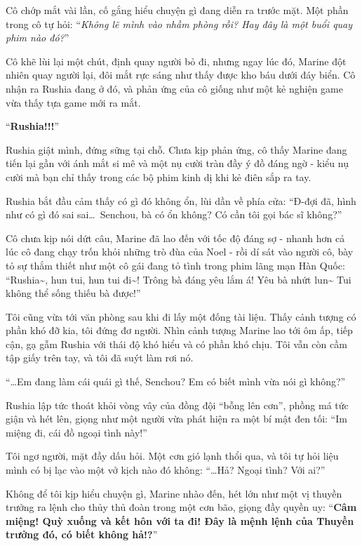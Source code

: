 \documentclass[../main.tex]{subfiles}
\begin{document}
Cô chớp mắt vài lần, cố gắng hiểu chuyện gì đang diễn ra trước mặt. Một phần trong cô tự hỏi: ``\textit{Không lẽ mình vào nhầm phòng rồi? Hay đây là một buổi quay phim nào đó?}''

Cô khẽ lùi lại một chút, định quay người bỏ đi, nhưng ngay lúc đó, Marine đột nhiên quay người lại, đôi mắt rực sáng như thấy được kho báu dưới đáy biển. Cô nhận ra Rushia đang ở đó, và phản ứng của cô giống như một kẻ nghiện game vừa thấy tựa game mới ra mắt.

``\textbf{Rushia!!!}''

Rushia giật mình, đứng sững tại chỗ. Chưa kịp phản ứng, cô thấy Marine đang tiến lại gần với ánh mắt si mê và một nụ cười tràn đầy ý đồ đáng ngờ - kiểu nụ cười mà bạn chỉ thấy trong các bộ phim kinh dị khi kẻ điên sắp ra tay.

Rushia bắt đầu cảm thấy có gì đó không ổn, lùi dần về phía cửa: ``Đ-đợi đã, hình như có gì đó sai sai\dots\ Senchou, bà có ổn không? Có cần tôi gọi bác sĩ không?''

Cô chưa kịp nói dứt câu, Marine đã lao đến với tốc độ đáng sợ - nhanh hơn cả lúc cô đang chạy trốn khỏi những trò đùa của Noel - rồi dí sát vào người cô, bày tỏ sự thắm thiết như một cô gái đang tỏ tình trong phim lãng mạn Hàn Quốc: ``Rushia\~{}, hun tui, hun tui đi\~{}! Trông bà đáng yêu lắm á! Yêu bà nhứt lun\~{} Tui không thể sống thiếu bà được!''


Tôi cũng vừa tới văn phòng sau khi đi lấy một đống tài liệu. Thấy cảnh tượng có phần khó đỡ kia, tôi đứng đơ người. Nhìn cảnh tượng Marine lao tới ôm ấp, tiếp cận, gạ gẫm Rushia với thái độ khó hiểu và có phần khó chịu. Tôi vẫn còn cầm tập giấy trên tay, và tôi đã suýt làm rơi nó.

``\dots  Em đang làm cái quái gì thế, Senchou? Em có biết mình vừa nói gì không?''

Rushia lập tức thoát khỏi vòng vây của đồng đội ``bỗng lên cơn'', phồng má tức giận và hét lên, giọng như một người vừa phát hiện ra một bí mật đen tối: ``Im miệng đi, cái đồ ngoại tình này!''

Tôi ngơ người, mặt đầy dấu hỏi. Một cơn gió lạnh thổi qua, và tôi tự hỏi liệu mình có bị lạc vào một vở kịch nào đó không: ``\dots  Hả? Ngoại tình? Với ai?''

Không để tôi kịp hiểu chuyện gì, Marine nhào đến, hét lớn như một vị thuyền trưởng ra lệnh cho thủy thủ đoàn trong một cơn bão, giọng đầy quyền uy: ``\textbf{Câm miệng! Quỳ xuống và kết hôn với ta đi! Đây là mệnh lệnh của Thuyền trưởng đó, có biết không hả!?}''
\end{document}
